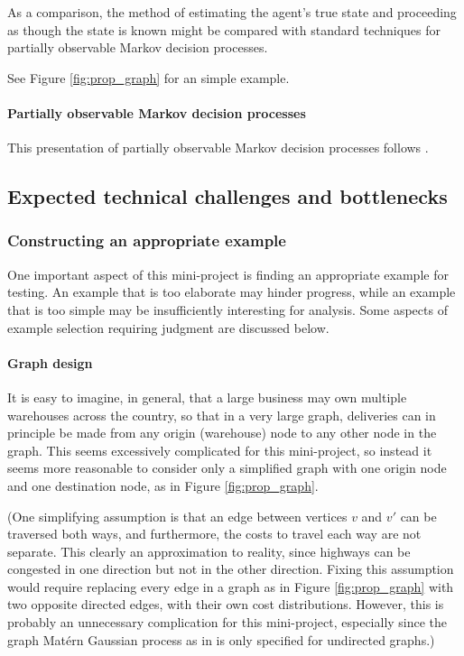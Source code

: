 As a comparison, the method of estimating the agent's true state and proceeding as though the state is known might be compared with standard techniques for partially observable Markov decision processes.

See Figure \ref{fig:prop_graph} for an simple example.

\paragraph{Partially observable Markov decision processes} This presentation of partially observable Markov decision processes follows \cite[Ch. 12]{rl_sota}.

\subsection{Expected technical challenges and bottlenecks}

\subsubsection{Constructing an appropriate example}

One important aspect of this mini-project is finding an appropriate example for testing. An example that is too elaborate may hinder progress, while an example that is too simple may be insufficiently interesting for analysis. Some aspects of example selection requiring judgment are discussed below.

\paragraph{Graph design} It is easy to imagine, in general, that a large business may own multiple warehouses across the country, so that in a very large graph, deliveries can in principle be made from any origin (warehouse) node to any other node in the graph. This seems excessively complicated for this mini-project, so instead it seems more reasonable to consider only a simplified graph with one origin node and one destination node, as in Figure \ref{fig:prop_graph}.

(One simplifying assumption is that an edge between vertices $v$ and $v'$ can be traversed both ways, and furthermore, the costs to travel each way are not separate. This clearly an approximation to reality, since highways can be congested in one direction but not in the other direction. Fixing this assumption would require replacing every edge in a graph as in Figure \ref{fig:prop_graph} with two opposite directed edges, with their own cost distributions. However, this is probably an unnecessary complication for this mini-project, especially since the graph Mat\'{e}rn Gaussian process as in \cite{pmlr-v130-borovitskiy21a} is only specified for undirected graphs.)

